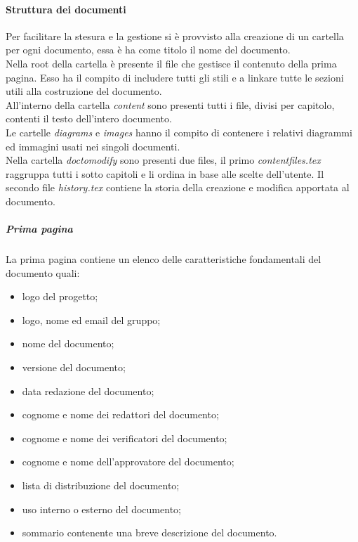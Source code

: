 			\paragraph{Struttura dei documenti}
			Per facilitare la stesura e la gestione si è provvisto alla creazione di un cartella per ogni documento, essa è ha come titolo il nome del documento.\\
			Nella root della cartella è presente il file che gestisce il contenuto della prima pagina. Esso ha il compito di includere tutti gli stili e a linkare tutte le sezioni utili alla costruzione del documento.\\
			All'interno della cartella \emph{content} sono presenti tutti i file, divisi per capitolo, contenti il testo dell'intero documento.\\
			Le cartelle \emph{diagrams} e \emph{images} hanno il compito di contenere i relativi diagrammi ed immagini usati nei singoli documenti.\\
			Nella cartella \emph{doc\textunderscore to\textunderscore modify} sono presenti due files, il primo \emph{content\textunderscore files.tex} raggruppa tutti i sotto capitoli e li ordina in base alle scelte dell'utente. Il secondo file \emph{history.tex} contiene la storia della creazione e modifica apportata al documento.

				\subparagraph{Prima pagina}
				La prima pagina contiene un elenco delle caratteristiche fondamentali del documento quali:
				\begin{itemize}
					\item logo del progetto;
					\item logo, nome ed email del gruppo; 
					\item nome del documento;
					\item versione del documento;
					\item data redazione del documento;
					\item cognome e nome dei redattori del documento;
					\item cognome e nome dei verificatori del documento;
					\item cognome e nome dell'approvatore del documento;
					\item lista di distribuzione del documento;
					\item uso interno o esterno del documento;
					\item sommario contenente una breve descrizione del documento.
				\end{itemize}
			
